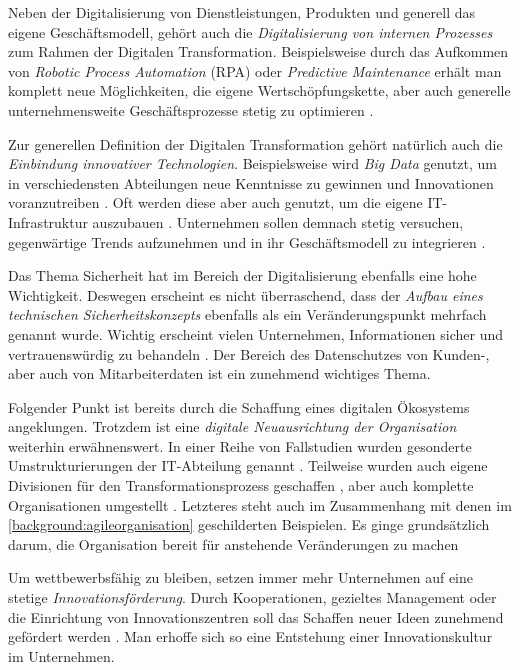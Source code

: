 Neben der Digitalisierung  von Dienstleistungen, Produkten und generell das eigene Geschäftsmodell, gehört auch die \textit{Digitalisierung von internen Prozesses} zum Rahmen der Digitalen Transformation. Beispielsweise durch das Aufkommen von \textit{Robotic Process Automation} (RPA) oder \textit{Predictive Maintenance} erhält man komplett neue Möglichkeiten, die eigene Wertschöpfungskette, aber auch generelle unternehmensweite Geschäftsprozesse  stetig zu optimieren \cite[S. 16f.]{urbach_digitalization_2018}.

Zur generellen Definition der Digitalen Transformation gehört natürlich auch die \textit{Einbindung innovativer Technologien}. Beispielsweise wird \textit{Big Data} genutzt, um in verschiedensten Abteilungen neue Kenntnisse zu gewinnen und Innovationen voranzutreiben \cite[S. 22]{gartner_fallstudien_2018}. Oft werden diese aber auch genutzt, um die eigene IT-Infrastruktur auszubauen \cite[S. 8]{chanias_digital_2018}. Unternehmen sollen demnach stetig versuchen, gegenwärtige Trends aufzunehmen und in ihr Geschäftsmodell zu integrieren \cite[S. S. 89]{gartner_fallstudien_2018}.

Das Thema Sicherheit hat im Bereich der Digitalisierung ebenfalls eine hohe Wichtigkeit. Deswegen erscheint es nicht überraschend, dass der \textit{Aufbau eines technischen Sicherheitskonzepts} ebenfalls als ein Veränderungspunkt mehrfach genannt wurde. Wichtig erscheint vielen Unternehmen, Informationen sicher und vertrauenswürdig zu behandeln \cite[S. 8]{weber_digital_2015}. Der Bereich des Datenschutzes von Kunden-, aber auch von Mitarbeiterdaten ist ein zunehmend wichtiges Thema.

Folgender Punkt ist bereits durch die Schaffung eines digitalen Ökosystems angeklungen. Trotzdem ist eine \textit{digitale Neuausrichtung der Organisation} weiterhin erwähnenswert. In einer Reihe von Fallstudien wurden gesonderte Umstrukturierungen der IT-Abteilung genannt \cite[S. 393]{urbach_digitalization_2018}.  Teilweise wurden auch eigene Divisionen für den Transformationsprozess geschaffen \cite[S. 8]{beule_digital_2019}, aber auch komplette Organisationen umgestellt \cite[S. 4]{kawohl_digitale_2016}. Letzteres steht auch im Zusammenhang mit denen im \ref{background:agileorganisation} geschilderten Beispielen. Es ginge grundsätzlich darum, die Organisation bereit für anstehende Veränderungen zu machen \cite[S. 31]{berghaus_2016}

Um wettbewerbsfähig zu bleiben, setzen immer mehr Unternehmen auf eine stetige \textit{Innovationsförderung}. Durch Kooperationen, gezieltes Management oder die Einrichtung von Innovationszentren soll das Schaffen neuer Ideen zunehmend gefördert werden \cite[S. 33]{buxmann_digitalisieren_2016}. Man erhoffe sich so eine Entstehung einer Innovationskultur im Unternehmen.

